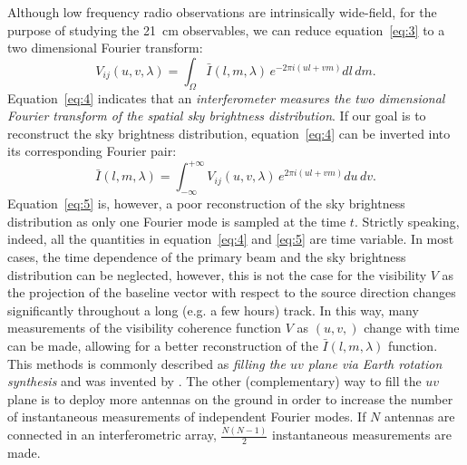 Although low frequency radio observations are intrinsically wide-field, for the purpose of studying the 21~cm observables, we can reduce equation~\ref{eq:3} to a two dimensional Fourier transform:
\begin{equation}
V_{ij} (u,v, \lambda) = \int_\Omega {\bar I} (l, m, \lambda) \, e^{-2 \pi i (ul + vm)} dl \, dm.
\label{eq:4}
\end{equation}
Equation~\ref{eq:4} indicates that an {\it interferometer measures the two dimensional Fourier transform of the spatial sky brightness distribution}. If our goal is to reconstruct the sky brightness distribution, equation~\ref{eq:4} can be inverted into its corresponding Fourier pair:
\begin{equation}
{\bar I} (l, m, \lambda) = \int_{- \infty}^{+ \infty} V_{ij} (u,v, \lambda) \, e^{2 \pi i (ul + vm)} du \, dv.
\label{eq:5}
\end{equation}
Equation~\ref{eq:5} is, however, a poor reconstruction of the sky brightness distribution as only one Fourier mode is sampled at the time $t$. Strictly speaking, indeed, all the quantities in equation~\ref{eq:4} and \ref{eq:5} are time variable. In most cases, the time dependence of the primary beam and the sky brightness distribution can be neglected, however, this is not the case for the visibility $V$ as the projection of the baseline vector with respect to the source direction changes significantly throughout a long (e.g. a few hours) track. In this way, many measurements of the visibility coherence function $V$ as $(u,v,)$ change with time can be made, allowing for a better reconstruction of the ${\bar I} (l, m, \lambda)$ function. This methods is commonly described as {\it filling the $uv$ plane via Earth rotation synthesis} and was invented by \cite{???}. The other (complementary) way to fill the $uv$ plane is to deploy more antennas on the ground in order to increase the number of instantaneous measurements of independent Fourier modes. If $N$ antennas are connected in an interferometric array, $\frac{N (N - 1)}{2}$ instantaneous measurements are made. 

